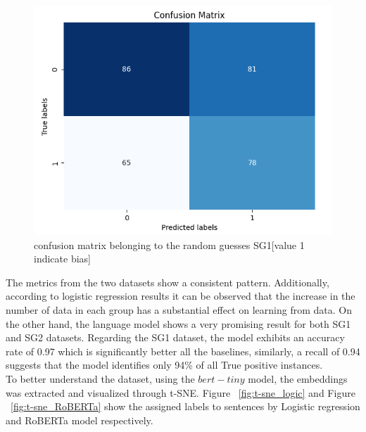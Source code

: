 \documentclass[11pt,a4paper]{article}
\begin{document}
\begin{figure}
    \centering
    \includegraphics[width=0.9\linewidth]{cm_SG1_random_guess.png}
    \caption{confusion matrix belonging to the random guesses SG1[value 1 indicate bias]}
    \label{fig:enter-label}
\end{figure}
The metrics from the two datasets show a consistent pattern. Additionally, according to logistic regression results it can be observed that the increase in the number of data in each group has a substantial effect on learning from data.
On the other hand, the language model shows a very promising result for both SG1 and SG2 datasets. Regarding the SG1 dataset, the model exhibits an accuracy rate of 0.97 which is significantly better all the baselines, similarly, a recall of 0.94 suggests that the model identifies only 94\% of all True positive instances.\\
To better understand the dataset, using the $bert-tiny$ model, the embeddings was extracted and visualized through t-SNE. Figure ~\ref{fig:t-sne_logic} and Figure ~\ref{fig:t-sne_RoBERTa} show the assigned labels to sentences by Logistic regression and RoBERTa model respectively.
\end{document}
